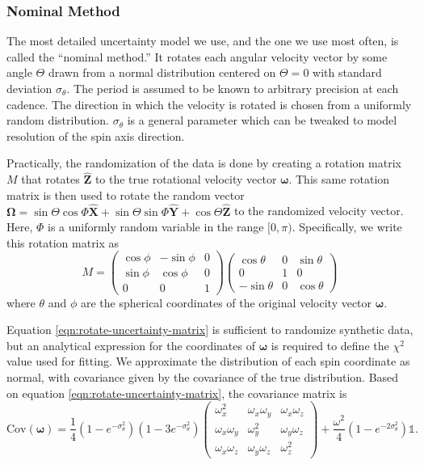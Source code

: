 \documentclass[linenumbers]{aastex631}
\newcommand{\unit}[1]{\hat{\mathbf{#1}}}
\newcommand{\parens}[1]{\left( #1 \right)}
\begin{document}
\subsubsection{Nominal Method}
The most detailed uncertainty model we use, and the one we use most often, is called the ``nominal method.'' It rotates each angular velocity vector by some angle $\Theta$ drawn from a normal distribution centered on $\Theta=0$ with standard deviation $\sigma_\theta$. The period is assumed to be known to arbitrary precision at each cadence. The direction in which the velocity is rotated is chosen from a uniformly random distribution. $\sigma_\theta$ is a general parameter which can be tweaked to model resolution of the spin axis direction.

Practically, the randomization of the data is done by creating a rotation matrix $M$ that rotates $\unit Z$ to the true rotational velocity vector $\bm \omega$. This same rotation matrix is then used to rotate the random vector $\bm \Omega = \sin \Theta \cos\Phi \unit X + \sin \Theta \sin \Phi\unit Y + \cos \Theta\unit Z$ to the randomized velocity vector. Here, $\Phi$ is a uniformly random variable in the range $[0, \pi)$. Specifically, we write this rotation matrix as
\begin{equation}
M = \parens{\begin{array}{ccc}
\cos \phi & -\sin \phi & 0\\
\sin \phi & \cos \phi & 0\\
0 & 0 & 1
\end{array}}
\parens{\begin{array}{ccc}
\cos \theta & 0 & \sin \theta \\
0 & 1 & 0\\
-\sin \theta & 0 & \cos \theta
\end{array}}
\label{eqn:rotate-uncertainty-matrix}
\end{equation}
where $\theta$ and $\phi$ are the spherical coordinates of the original velocity vector $\bm \omega.$

Equation \ref{eqn:rotate-uncertainty-matrix} is sufficient to randomize synthetic data, but an analytical expression for the coordinates of $\bm \omega$ is required to define the $\chi^2$ value used for fitting. We approximate the distribution of each spin coordinate as normal, with covariance given by the covariance of the true distribution. Based on equation \ref{eqn:rotate-uncertainty-matrix}, the covariance matrix is
\begin{equation}
\text{Cov}(\bm \omega) = \frac{1}{4}\parens{1-e^{-\sigma_\theta^2}} \parens{1-3e^{-\sigma_\theta^2}}\parens{\begin{array}{ccc}
\omega_x^2 & \omega_x \omega_y& \omega_x \omega_z\\
\omega_x \omega_y & \omega_y^2 & \omega_y \omega_z\\
\omega_x \omega_z & \omega_y \omega_z& \omega_z^2
\end{array}} +  \frac{\omega^2}{4}\parens{1 - e^{-2\sigma_\theta^2}} \mathds{1}.
\label{eqn:rotate-uncertainty-var}
\end{equation}
\end{document}
